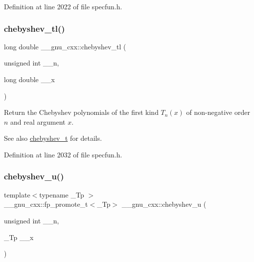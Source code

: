 Definition at line 2022 of file specfun.\+h.

\mbox{\label{group__gnu__math__spec__func_ga0c421700d244cdf58e3ac5ff267664d1}} 
\subsubsection{\texorpdfstring{chebyshev\+\_\+tl()}{chebyshev\_tl()}}
{\footnotesize\ttfamily long double \+\_\+\+\_\+gnu\+\_\+cxx\+::chebyshev\+\_\+tl (\begin{DoxyParamCaption}\item[{unsigned int}]{\+\_\+\+\_\+n,  }\item[{long double}]{\+\_\+\+\_\+x }\end{DoxyParamCaption})\hspace{0.3cm}{\ttfamily [inline]}}

Return the Chebyshev polynomials of the first kind $ T_n(x) $ of non-\/negative order $ n $ and real argument $ x $.

\begin{DoxySeeAlso}{See also}
\hyperlink{group__gnu__math__spec__func_ga4d9cae9de13a64ceeb4fb0226f4b7844}{chebyshev\+\_\+t} for details. 
\end{DoxySeeAlso}


Definition at line 2032 of file specfun.\+h.

\mbox{\label{group__gnu__math__spec__func_gafa90c06bdedb8459f20576297cf1608f}} 
\subsubsection{\texorpdfstring{chebyshev\+\_\+u()}{chebyshev\_u()}}
{\footnotesize\ttfamily template$<$typename \+\_\+\+Tp $>$ \\
\+\_\+\+\_\+gnu\+\_\+cxx\+::fp\+\_\+promote\+\_\+t$<$\+\_\+\+Tp$>$ \+\_\+\+\_\+gnu\+\_\+cxx\+::chebyshev\+\_\+u (\begin{DoxyParamCaption}\item[{unsigned int}]{\+\_\+\+\_\+n,  }\item[{\+\_\+\+Tp}]{\+\_\+\+\_\+x }\end{DoxyParamCaption})\hspace{0.3cm}{\ttfamily [inline]}}

